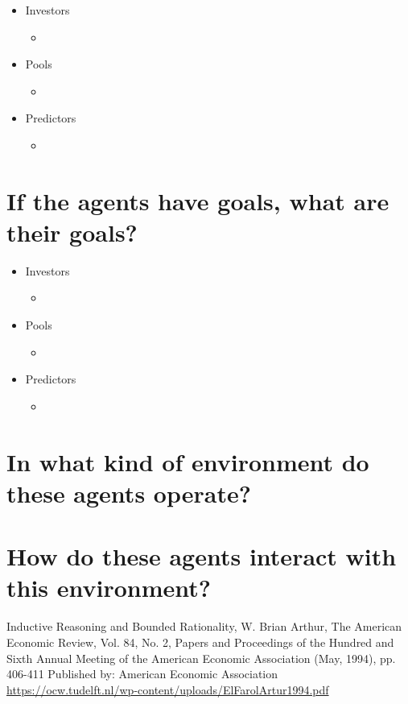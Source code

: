 \documentclass[]{article}
\begin{document}
\begin{itemize}
	\item Investors
	\begin{itemize}
		\item 
	\end{itemize}
	\item Pools
	\begin{itemize}
		\item 
	\end{itemize}
	\item Predictors
	\begin{itemize}
		\item 
	\end{itemize}
\end{itemize}
\section{If the agents have goals, what are their goals?}
\begin{itemize}
	\item Investors
	\begin{itemize}
		\item 
	\end{itemize}
	\item Pools
	\begin{itemize}
		\item 
	\end{itemize}
	\item Predictors
	\begin{itemize}
		\item 
	\end{itemize}
\end{itemize}
\section{In what kind of environment do these agents operate?}
\section{How do these agents interact with this environment?}

\begin{thebibliography}{9}
Inductive Reasoning and Bounded Rationality,
W. Brian Arthur,
The American Economic Review, 
Vol. 84, No. 2, Papers and Proceedings of the
Hundred and Sixth Annual Meeting of the American Economic Association (May, 1994), pp. 406-411
Published by: American Economic Association
\url{https://ocw.tudelft.nl/wp-content/uploads/ElFarolArtur1994.pdf}
\end{thebibliography}
\end{document}
